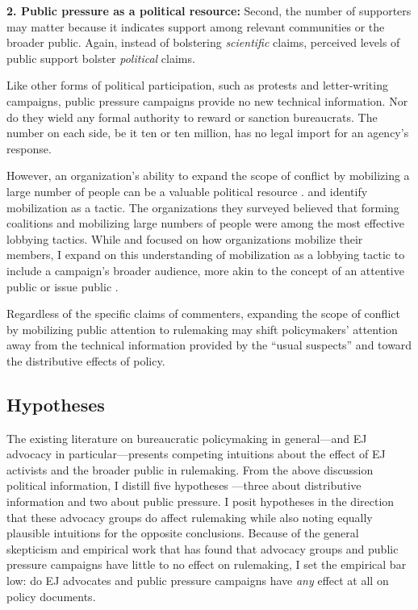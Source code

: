 \documentclass[
      12pt,
        ]{article}
\begin{document}
\textbf{2. Public pressure as a political resource: }
Second, the number of supporters may
matter because it indicates support among relevant communities or the broader public. Again, instead of bolstering \emph{scientific} claims, perceived levels of public support bolster \emph{political} claims.

Like other forms of political participation, such as protests and letter-writing campaigns,
public pressure campaigns provide no new technical information.
Nor do they wield any formal authority to reward or sanction bureaucrats.
The number on each side, be it ten or ten million, has no legal import for an agency's response.

However, an organization's ability to expand the scope of conflict by mobilizing
a large number of people can be a valuable political resource \citep{Schattschneider1975}. \citet{Furlong1997} and \citet{Kerwin2011}
identify mobilization as a tactic. The organizations they surveyed
believed that forming coalitions and mobilizing large numbers of people
were among the most effective lobbying tactics. While \citet{Furlong1997} and \citet{Kerwin2011} focused on how
organizations mobilize their members, I expand on this understanding of mobilization as a lobbying tactic to include a campaign's broader audience, more akin to the concept of
an attentive public \citep{Key1961} or issue public \citep{Converse1964}.

Regardless of the specific claims of commenters, expanding the scope of conflict by mobilizing public attention to rulemaking may shift policymakers' attention away from the technical information provided by the ``usual suspects'' and toward the distributive effects of policy.

\hypertarget{hypotheses}{%
\subsection{Hypotheses}\label{hypotheses}}

The existing literature on bureaucratic policymaking in general---and EJ advocacy in particular---presents competing intuitions about the effect of EJ activists and the broader public in rulemaking. From the above discussion political information, I distill five hypotheses ---three about distributive information and two about public pressure. I posit hypotheses in the direction that these advocacy groups do affect rulemaking while also noting equally plausible intuitions for the opposite conclusions. Because of the general skepticism and empirical work that has found that advocacy groups and public pressure campaigns have little to no effect on rulemaking, I set the empirical bar low: do EJ advocates and public pressure campaigns have \emph{any} effect at all on policy documents.
\end{document}
